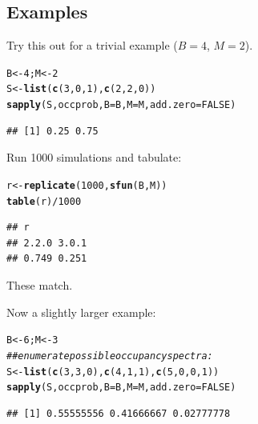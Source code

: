 \documentclass{article}\usepackage[]{graphicx}\usepackage[]{color}
\makeatletter
\newcommand{\hlnum}[1]{\textcolor[rgb]{0.686,0.059,0.569}{#1}}%
\newcommand{\hlcom}[1]{\textcolor[rgb]{0.678,0.584,0.686}{\textit{#1}}}%
\newcommand{\hlopt}[1]{\textcolor[rgb]{0,0,0}{#1}}%
\newcommand{\hlstd}[1]{\textcolor[rgb]{0.345,0.345,0.345}{#1}}%
\newcommand{\hlkwb}[1]{\textcolor[rgb]{0.69,0.353,0.396}{#1}}%
\newcommand{\hlkwc}[1]{\textcolor[rgb]{0.333,0.667,0.333}{#1}}%
\newcommand{\hlkwd}[1]{\textcolor[rgb]{0.737,0.353,0.396}{\textbf{#1}}}%
\newenvironment{kframe}{%
 \def\at@end@of@kframe{}%
 \ifinner\ifhmode%
  \def\at@end@of@kframe{\end{minipage}}%
  \begin{minipage}{\columnwidth}%
 \fi\fi%
 \def\FrameCommand##1{\hskip\@totalleftmargin \hskip-\fboxsep
 \colorbox{shadecolor}{##1}\hskip-\fboxsep
     \hskip-\linewidth \hskip-\@totalleftmargin \hskip\columnwidth}%
 \MakeFramed {\advance\hsize-\width
   \@totalleftmargin\z@ \linewidth\hsize
   \@setminipage}}%
 {\par\unskip\endMakeFramed%
 \at@end@of@kframe}
\newenvironment{knitrout}{}{} %
\makeatother
\begin{document}
\subsection{Examples}
Try this out for a trivial example ($B=4$, $M=2$).
\begin{knitrout}
\color{fgcolor}\begin{kframe}
\begin{alltt}
\hlstd{B} \hlkwb{<-} \hlnum{4}\hlstd{; M} \hlkwb{<-} \hlnum{2}
\hlstd{S} \hlkwb{<-} \hlkwd{list}\hlstd{(}\hlkwd{c}\hlstd{(}\hlnum{3}\hlstd{,}\hlnum{0}\hlstd{,}\hlnum{1}\hlstd{),}\hlkwd{c}\hlstd{(}\hlnum{2}\hlstd{,}\hlnum{2}\hlstd{,}\hlnum{0}\hlstd{))}
\hlkwd{sapply}\hlstd{(S,occprob,}\hlkwc{B}\hlstd{=B,}\hlkwc{M}\hlstd{=M,}\hlkwc{add.zero}\hlstd{=}\hlnum{FALSE}\hlstd{)}
\end{alltt}
\begin{verbatim}
## [1] 0.25 0.75
\end{verbatim}
\end{kframe}
\end{knitrout}

Run 1000 simulations and tabulate:
\begin{knitrout}
\color{fgcolor}\begin{kframe}
\begin{alltt}
\hlstd{r} \hlkwb{<-} \hlkwd{replicate}\hlstd{(}\hlnum{1000}\hlstd{,}\hlkwd{sfun}\hlstd{(B,M))}
\hlkwd{table}\hlstd{(r)}\hlopt{/}\hlnum{1000}
\end{alltt}
\begin{verbatim}
## r
## 2.2.0 3.0.1 
## 0.749 0.251
\end{verbatim}
\end{kframe}
\end{knitrout}

These match.

Now a slightly larger example:
\begin{knitrout}
\color{fgcolor}\begin{kframe}
\begin{alltt}
\hlstd{B} \hlkwb{<-} \hlnum{6}\hlstd{; M} \hlkwb{<-} \hlnum{3}
\hlcom{## enumerate possible occupancy spectra:}
\hlstd{S} \hlkwb{<-} \hlkwd{list}\hlstd{(}\hlkwd{c}\hlstd{(}\hlnum{3}\hlstd{,}\hlnum{3}\hlstd{,}\hlnum{0}\hlstd{),}\hlkwd{c}\hlstd{(}\hlnum{4}\hlstd{,}\hlnum{1}\hlstd{,}\hlnum{1}\hlstd{),}\hlkwd{c}\hlstd{(}\hlnum{5}\hlstd{,}\hlnum{0}\hlstd{,}\hlnum{0}\hlstd{,}\hlnum{1}\hlstd{))}
\hlkwd{sapply}\hlstd{(S,occprob,}\hlkwc{B}\hlstd{=B,}\hlkwc{M}\hlstd{=M,}\hlkwc{add.zero}\hlstd{=}\hlnum{FALSE}\hlstd{)}
\end{alltt}
\begin{verbatim}
## [1] 0.55555556 0.41666667 0.02777778
\end{verbatim}
\end{kframe}
\end{knitrout}
\end{document}
